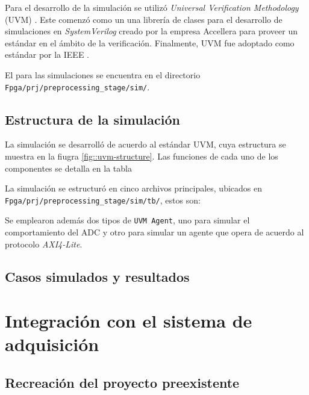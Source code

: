 \documentclass[../../main.tex]{subfiles}
\begin{document}
Para el desarrollo de la simulación se utilizó \textit{Universal Verification Methodology} (UVM) \cite{uvm}. Este comenzó como un una librería de clases para el desarrollo de simulaciones en \textit{SystemVerilog} creado por la empresa Accellera para proveer un estándar en el ámbito de la verificación. Finalmente, UVM fue adoptado como estándar por la IEEE \cite{uvm-ieee}.

El para las simulaciones se encuentra en el directorio \texttt{Fpga/prj/preprocessing\_stage/sim/}.

\subsection{Estructura de la simulación}
La simulación se desarrolló de acuerdo al estándar UVM, cuya estructura se muestra en la fiugra \ref{fig::uvm-structure}. Las funciones de cada uno de los componentes se detalla en la tabla 


La simulación se estructuró en cinco archivos principales, ubicados en \texttt{Fpga/prj/preprocessing\_stage/sim/tb/}, estos son:


Se emplearon además dos tipos de \texttt{UVM Agent}, uno para simular el comportamiento del ADC y otro para simular un agente que opera de acuerdo al protocolo \textit{AXI4-Lite}\cite{AXI-4}. 


\subsection{Casos simulados y resultados}



\section{Integración con el sistema de adquisición}
\subsection{Recreación del proyecto preexistente}
\end{document}
